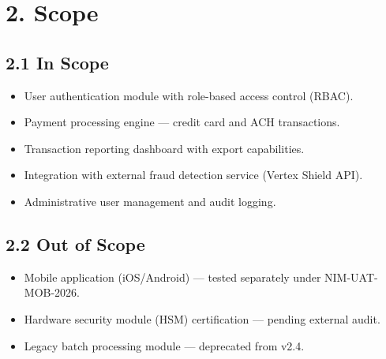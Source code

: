 \section*{\color{primaryNavy}2. Scope}
\sectionline

\subsection*{2.1 In Scope}

\begin{itemize}[nosep, leftmargin=*]
  \item User authentication module with role-based access control (RBAC).
  \item Payment processing engine --- credit card and ACH transactions.
  \item Transaction reporting dashboard with export capabilities.
  \item Integration with external fraud detection service (Vertex Shield API).
  \item Administrative user management and audit logging.
\end{itemize}

\subsection*{2.2 Out of Scope}

\begin{itemize}[nosep, leftmargin=*]
  \item Mobile application (iOS/Android) --- tested separately under NIM-UAT-MOB-2026.
  \item Hardware security module (HSM) certification --- pending external audit.
  \item Legacy batch processing module --- deprecated from v2.4.
\end{itemize}
